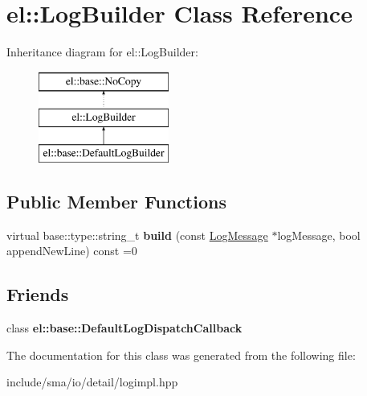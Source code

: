 \hypertarget{classel_1_1LogBuilder}{\section{el\-:\-:Log\-Builder Class Reference}
\label{classel_1_1LogBuilder}
}
Inheritance diagram for el\-:\-:Log\-Builder\-:\begin{figure}[H]
\begin{center}
\leavevmode
\includegraphics[height=3.000000cm]{classel_1_1LogBuilder}
\end{center}
\end{figure}
\subsection*{Public Member Functions}
\begin{DoxyCompactItemize}
\item 
\hypertarget{classel_1_1LogBuilder_a633b373a3bb9d3e17bdd664aeba4dbc8}{virtual base\-::type\-::string\-\_\-t {\bfseries build} (const \hyperlink{classel_1_1LogMessage}{Log\-Message} $\ast$log\-Message, bool append\-New\-Line) const =0}\label{classel_1_1LogBuilder_a633b373a3bb9d3e17bdd664aeba4dbc8}

\end{DoxyCompactItemize}
\subsection*{Friends}
\begin{DoxyCompactItemize}
\item 
\hypertarget{classel_1_1LogBuilder_a42b1de96d584ae4fecbfc2b9aff95052}{class {\bfseries el\-::base\-::\-Default\-Log\-Dispatch\-Callback}}\label{classel_1_1LogBuilder_a42b1de96d584ae4fecbfc2b9aff95052}

\end{DoxyCompactItemize}


The documentation for this class was generated from the following file\-:\begin{DoxyCompactItemize}
\item 
include/sma/io/detail/logimpl.\-hpp\end{DoxyCompactItemize}
